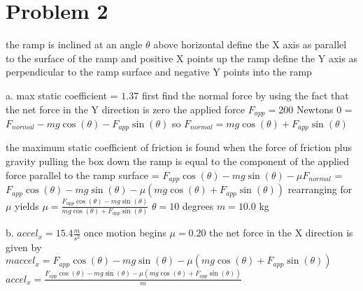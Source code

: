 \chapter{Problem 2}
\label{Problem 2}
the ramp is inclined at an angle $\theta$ above horizontal\newline
define the X axis as parallel to the surface of the ramp\newline
and positive X points up the ramp\newline
define the Y axis as perpendicular to the ramp surface\newline
and negative Y points into the ramp\newline

a. max static coefficient = $1.37$\newline
first find the normal force by using the fact that\newline
the net force in the Y direction is zero\newline
the applied force $F_{app} = 200$ Newtons
0 = $F_{normal} - mg\cos(\theta) - F_{app}\sin(\theta)$\newline
so $F_{normal} = mg\cos(\theta) + F_{app}\sin(\theta)$\newline

the maximum static coefficient of friction is\newline
found when the force of friction plus gravity pulling\newline
the box down the ramp is equal to the component of the\newline
applied force parallel to the ramp surface = $F_{app}\cos(\theta) - mg\sin(\theta) - \mu F_{normal}$ = $F_{app}\cos(\theta) - mg\sin(\theta) - \mu(mg\cos(\theta) + F_{app}\sin(\theta))$\newline
rearranging for $\mu$ yields\newline
$\mu = \frac{F_{app}\cos(\theta) - mg\sin(\theta)}{mg\cos(\theta) + F_{app}\sin(\theta)}$\newline
$\theta = 10$ degrees  $m = 10.0$ kg\newline

b. $accel_{x} = 15.4 \frac{m}{s^{2}}$ \newline
once motion begins $\mu = 0.20$\newline
the net force in the X direction is given by\newline
$maccel_{x} = F_{app}\cos(\theta) - mg\sin(\theta) - \mu(mg\cos(\theta) + F_{app}\sin(\theta))$\newline
$accel_{x} = \frac{F_{app}\cos(\theta) - mg\sin(\theta) - \mu(mg\cos(\theta) + F_{app}\sin(\theta))}{m}$\newline

